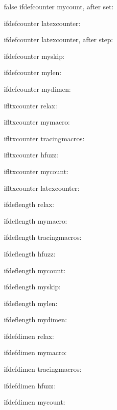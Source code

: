 \documentclass{article}
\begin{document}
\begin{true}{false}
\relax
ifdefcounter mycount, after set: 

ifdefcounter latexcounter: 

ifdefcounter latexcounter, after step: 

\newskip\myskip
ifdefcounter myskip: 

\newlength\mylen
ifdefcounter mylen: 

\newdimen\mydimen
ifdefcounter mydimen: 

ifltxcounter relax: 

ifltxcounter mymacro: 

ifltxcounter tracingmacros: 

ifltxcounter hfuzz: 

ifltxcounter mycount: 

ifltxcounter latexcounter: 

ifdeflength relax: 

ifdeflength mymacro: 

ifdeflength tracingmacros: 

ifdeflength hfuzz: 

ifdeflength mycount: 

ifdeflength myskip: 

ifdeflength mylen: 

ifdeflength mydimen: 

ifdefdimen relax: 

ifdefdimen mymacro: 

ifdefdimen tracingmacros: 

ifdefdimen hfuzz: 

ifdefdimen mycount: 


\end{true}
\end{document}

